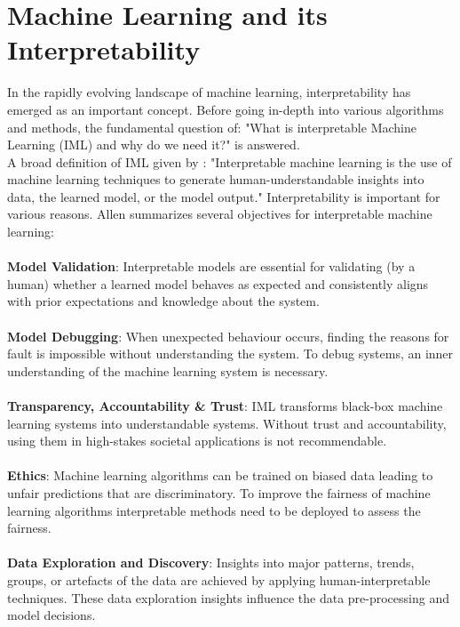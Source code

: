 \chapter{Machine Learning and its Interpretability}
\label{sec:MLandI}

In the rapidly evolving landscape of machine learning, interpretability has emerged as an important concept. Before going in-depth into various algorithms and methods, the fundamental question of: "What is interpretable Machine Learning (IML) and why do we need it?" is answered.
\\
A broad definition of IML given by \cite{allen2023interpretable}: "Interpretable machine learning is the use of machine learning techniques to generate human-understandable insights into data, the learned model, or the model output." Interpretability is important for various reasons. Allen\cite{allen2023interpretable} summarizes several objectives for interpretable machine learning: 
\\\\
\textbf{Model Validation}: Interpretable models are essential for validating (by a human) whether a learned model behaves as expected and consistently aligns with prior expectations and knowledge about the system.
\\\\
\textbf{Model Debugging}: When unexpected behaviour occurs, finding the reasons for fault is impossible without understanding the system. To debug systems, an inner understanding of the machine learning system is necessary.
\\\\
\textbf{Transparency, Accountability \& Trust}: IML transforms black-box machine learning systems into understandable systems. Without trust and accountability, using them in high-stakes societal applications is not recommendable.
\\\\
\textbf{Ethics}: Machine learning algorithms can be trained on biased data leading to unfair predictions that are discriminatory. To improve the fairness of machine learning algorithms interpretable methods need to be deployed to assess the fairness. 
\\\\
\textbf{Data Exploration and Discovery}: Insights into major patterns, trends, groups, or artefacts of the data are achieved by applying human-interpretable techniques. These data exploration insights influence the data pre-processing and model decisions. 


